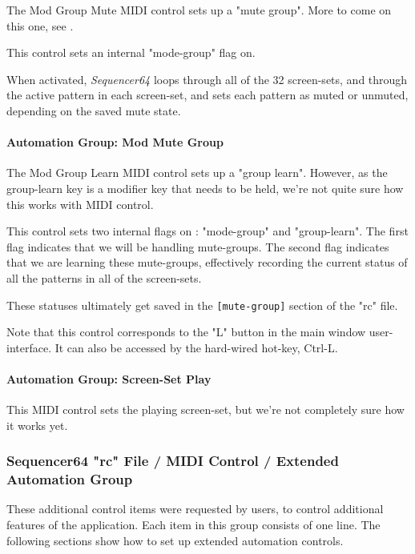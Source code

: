    The Mod Group Mute MIDI control sets up a "mute group".
   More to come on this one,
   see .

   This control sets an internal "mode-group" flag on.

   When activated, \textsl{Sequencer64} loops through all of the 32
   screen-sets, and through the active pattern in each screen-set, and
   sets each pattern as muted or unmuted, depending on the saved mute state.

\paragraph{Automation Group: Mod Mute Group}
\label{paragraph:seq64_rc_file_midi_ctrl_modgmute}

   The Mod Group Learn MIDI control sets up a "group learn".
   However, as the group-learn key is a modifier key that needs to
   be held, we're not quite sure how this works with MIDI control.

   This control sets two internal flags on : "mode-group" and "group-learn".
   The first flag indicates that we will be handling mute-groups.
   The second flag indicates that we are learning these mute-groups,
   effectively recording the current status of all the patterns in all of the
   screen-sets.

   These statuses ultimately get saved in the \texttt{[mute-group]} section of
   the "rc" file.

   Note that this control corresponds to the "L" button in the main window
   user-interface.
   It can also be accessed by the hard-wired hot-key, Ctrl-L.

\paragraph{Automation Group: Screen-Set Play}
\label{paragraph:seq64_rc_file_midi_ctrl_ssplay}

This MIDI control sets the playing screen-set, 
but we're not completely sure how it works yet.

\subsubsection{Sequencer64 "rc" File / MIDI Control / Extended Automation Group}
\label{subsubsec:seq64_rc_file_midi_ctrl_automationex}

   These additional control items were requested by users, to control
   additional features of the application.
   Each item in this group consists of one line.
   The following sections show how to set up extended automation controls.

